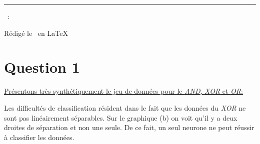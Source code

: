 \documentclass[a4paper,french,10pt]{article}
\begin{document}
	
	\title{\vspace{-1in}} %
	\author{} %
	\date{} %
	\maketitle %
	
	\usebox{\myReportTitle}
	\vspace{1in} %
	
	{\centering \huge \assignmentName \par}
	{\centering \noindent\rule{4in}{0.1pt} \par}
	\vspace{0.05in}
	{\centering \courseCode~: \courseName~ \par}
	{\centering Rédigé le \pubDate\ en \LaTeX \par}
	\vspace{1in}
	
	\tableofcontents
	\newpage
	
	
	\section{Question 1}
	
	\underline{Présentons très synthétiquement le jeu de données pour le \textit{AND}, \textit{XOR} et \textit{OR}:}
	
	Les difficultés de classification résident dans le fait que les données du \textit{XOR} ne sont pas linéairement séparables. Sur le graphique (b) on voit qu'il y a deux droites de séparation et non une seule. De ce fait, un seul neurone ne peut réussir à classifier les données.
	
\end{document}
